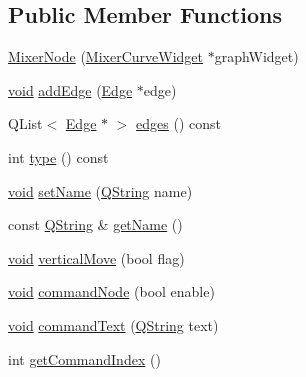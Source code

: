\subsection*{\-Public \-Member \-Functions}
\begin{DoxyCompactItemize}
\item 
\hyperlink{group___u_a_v_object_widget_utils_gad99e53701553bdb4852ccedd6362f5a2}{\-Mixer\-Node} (\hyperlink{class_mixer_curve_widget}{\-Mixer\-Curve\-Widget} $\ast$graph\-Widget)
\item 
\hyperlink{group___u_a_v_objects_plugin_ga444cf2ff3f0ecbe028adce838d373f5c}{void} \hyperlink{group___u_a_v_object_widget_utils_gaf8a1ccdbffed70e2995e75d37c57851c}{add\-Edge} (\hyperlink{class_edge}{\-Edge} $\ast$edge)
\item 
\-Q\-List$<$ \hyperlink{class_edge}{\-Edge} $\ast$ $>$ \hyperlink{group___u_a_v_object_widget_utils_ga40ed4006b807a83e49d061ed3d2660d2}{edges} () const 
\item 
int \hyperlink{group___u_a_v_object_widget_utils_gab4486e1ba0c3c072c94654c3af32b0c6}{type} () const 
\item 
\hyperlink{group___u_a_v_objects_plugin_ga444cf2ff3f0ecbe028adce838d373f5c}{void} \hyperlink{group___u_a_v_object_widget_utils_gadfd7806c5496ba5afcd31e2965292feb}{set\-Name} (\hyperlink{group___u_a_v_objects_plugin_gab9d252f49c333c94a72f97ce3105a32d}{\-Q\-String} name)
\item 
const \hyperlink{group___u_a_v_objects_plugin_gab9d252f49c333c94a72f97ce3105a32d}{\-Q\-String} \& \hyperlink{group___u_a_v_object_widget_utils_gade160748ca597706039a14036cf2cf49}{get\-Name} ()
\item 
\hyperlink{group___u_a_v_objects_plugin_ga444cf2ff3f0ecbe028adce838d373f5c}{void} \hyperlink{group___u_a_v_object_widget_utils_ga611004aca7ff8a9568500f208f9e4dd8}{vertical\-Move} (bool flag)
\item 
\hyperlink{group___u_a_v_objects_plugin_ga444cf2ff3f0ecbe028adce838d373f5c}{void} \hyperlink{group___u_a_v_object_widget_utils_ga3eb17fc4cf477877868bb1d9cc4baad9}{command\-Node} (bool enable)
\item 
\hyperlink{group___u_a_v_objects_plugin_ga444cf2ff3f0ecbe028adce838d373f5c}{void} \hyperlink{group___u_a_v_object_widget_utils_ga549e0ca95a0402dfc301e141de9e269e}{command\-Text} (\hyperlink{group___u_a_v_objects_plugin_gab9d252f49c333c94a72f97ce3105a32d}{\-Q\-String} text)
\item 
int \hyperlink{group___u_a_v_object_widget_utils_ga9256f0cba8c457485bfc00b660076d2b}{get\-Command\-Index} ()

\end{DoxyCompactItemize}

